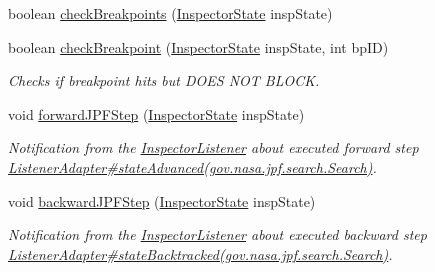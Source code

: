 \begin{DoxyCompactItemize}
boolean \hyperlink{classgov_1_1nasa_1_1jpf_1_1inspector_1_1server_1_1breakpoints_1_1_break_point_handler_a79c904ad644ba709054fa1f0a8c96c15}{check\+Breakpoints} (\hyperlink{interfacegov_1_1nasa_1_1jpf_1_1inspector_1_1server_1_1expression_1_1_inspector_state}{Inspector\+State} insp\+State)
\item 
boolean \hyperlink{classgov_1_1nasa_1_1jpf_1_1inspector_1_1server_1_1breakpoints_1_1_break_point_handler_a4df161c3fd005fb77e72a7f487110ea8}{check\+Breakpoint} (\hyperlink{interfacegov_1_1nasa_1_1jpf_1_1inspector_1_1server_1_1expression_1_1_inspector_state}{Inspector\+State} insp\+State, int bp\+ID)
\begin{DoxyCompactList}\small\item\em Checks if breakpoint hits but D\+O\+ES N\+OT B\+L\+O\+CK. \end{DoxyCompactList}\item 
void \hyperlink{classgov_1_1nasa_1_1jpf_1_1inspector_1_1server_1_1breakpoints_1_1_break_point_handler_ae57e22664ebb2cd97522c03c9514cd0e}{forward\+J\+P\+F\+Step} (\hyperlink{interfacegov_1_1nasa_1_1jpf_1_1inspector_1_1server_1_1expression_1_1_inspector_state}{Inspector\+State} insp\+State)
\begin{DoxyCompactList}\small\item\em Notification from the \hyperlink{}{Inspector\+Listener} about executed forward step \hyperlink{}{Listener\+Adapter\#state\+Advanced(gov.\+nasa.\+jpf.\+search.\+Search)}. \end{DoxyCompactList}\item 
void \hyperlink{classgov_1_1nasa_1_1jpf_1_1inspector_1_1server_1_1breakpoints_1_1_break_point_handler_a807b3ab4a9e132e1e20d6ecf72e48c5e}{backward\+J\+P\+F\+Step} (\hyperlink{interfacegov_1_1nasa_1_1jpf_1_1inspector_1_1server_1_1expression_1_1_inspector_state}{Inspector\+State} insp\+State)
\begin{DoxyCompactList}\small\item\em Notification from the \hyperlink{}{Inspector\+Listener} about executed backward step \hyperlink{}{Listener\+Adapter\#state\+Backtracked(gov.\+nasa.\+jpf.\+search.\+Search)}. \end{DoxyCompactList}\end{DoxyCompactItemize}
